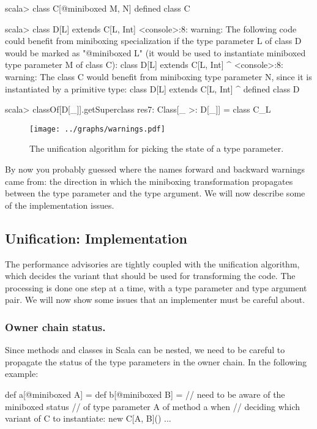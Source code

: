 \begin{lstlisting-nobreak-nolang}
scala> class C[@miniboxed M, N]
defined class C

scala> class D[L] extends C[L, Int]
<console>:8: warning: The following code could benefit from miniboxing specialization if the type parameter L of class D would be marked as "@miniboxed L" (it would be used to instantiate miniboxed type parameter M of class C):
       class D[L] extends C[L, Int]
             ^
<console>:8: warning: The class C would benefit from miniboxing type parameter N, since it is instantiated by a primitive type:
       class D[L] extends C[L, Int]
             ^
defined class D

scala> classOf[D[_]].getSuperclass
res7: Class[_ >: D[_]] = class C_L
\end{lstlisting-nobreak-nolang}

\begin{figure}[t!]
  \label{fig:algorithm}
  \centering
  \texttt{[image: ../graphs/warnings.pdf]}
  \vspace{0.01\textheight}
  \caption{The unification algorithm for picking the state of a type parameter.}
\end{figure}

By now you probably guessed where the names forward and backward warnings came from: the direction in which the miniboxing transformation propagates between the type parameter and the type argument. We will now describe some of the implementation issues.

\subsection{Unification: Implementation}

The performance advisories are tightly coupled with the unification algorithm, which decides the variant that should be used for transforming the code. The processing is done one step at a time, with a type parameter and type argument pair. We will now show some issues that an implementer must be careful about.

\subsubsection{Owner chain status.} Since methods and classes in Scala can be nested, we need to be careful to propagate the status of the type parameters in the owner chain. In the following example:

\begin{lstlisting-nobreak}
 def a[@miniboxed A] = {
   def b[@miniboxed B] = {
     // need to be aware of the miniboxed status
     // of type parameter A of method a when
     // deciding which variant of C to instantiate:
     new C[A, B]()
   }
   ...
 }
\end{lstlisting-nobreak}

